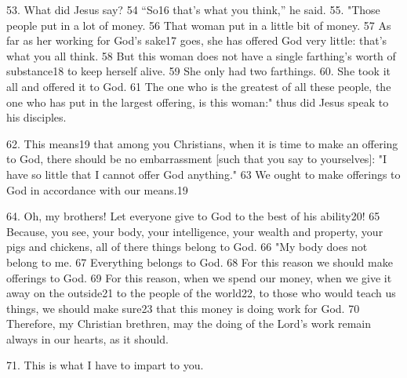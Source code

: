 53. What did Jesus say? 54 ``So16 that's what you think,'' he said.
55. "Those people put in a lot of money. 56 That woman put in a little
bit of money. 57 As far as her working for God's sake17 goes, she has offered God
very little: that's what you all think. 58 But this woman does not have a single
farthing's worth of substance18 to keep herself alive. 59 She only had two farthings.
60. She took it all and offered it to God. 61 The one who is the greatest of all
these people, the one who has put in the largest offering, is this woman:"
thus did Jesus speak to his disciples.

62. This means19 that among you Christians, when it is time to make an offering
to God, there should be no embarrassment [such that you say to yourselves]: "I
have so little that I cannot offer God anything." 63 We ought to make
offerings to God in accordance with our means.19

64. Oh, my brothers! Let everyone give to God to the best of his ability20! 65 Because,
you see, your body, your intelligence, your wealth and property, your pigs and
chickens, all of there things belong to God. 66 "My body does not belong
to me. 67 Everything belongs to God. 68 For this reason we should make offerings
to God. 69 For this reason, when we spend our money, when we give it away on the
outside21 to the people of the world22, to those who would teach us things, we
should make sure23 that this money is doing work for God. 70 Therefore, my Christian
brethren, may the doing of the Lord's work remain always in our hearts, as it should.

71. This is what I have to impart to you.

